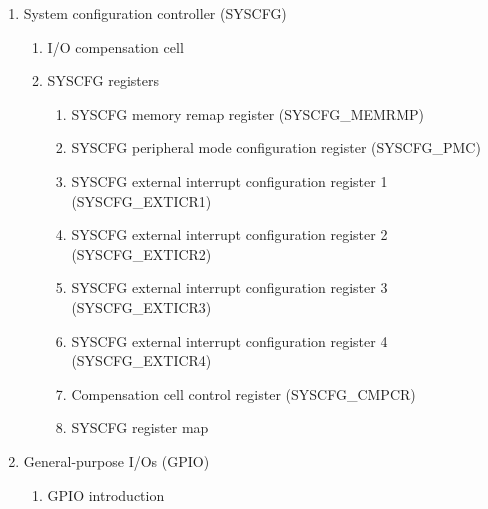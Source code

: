 \documentclass{article}
\begin{document}
\begin{enumerate}
\begin{enumerate}
\begin{enumerate}
            \item RCC Backup domain control register (RCC\_BDCR) 
            \item RCC clock control \& status register (RCC\_CSR) 
            \item RCC spread spectrum clock generation register (RCC\_SSCGR) 
            \item RCC PLLI2S configuration register (RCC\_PLLI2SCFGR) 
            \item RCC Dedicated Clocks Configuration Register (RCC\_DCKCFGR) 
            \item RCC register map 
        \end{enumerate}
    \end{enumerate}
    \item System configuration controller (SYSCFG) 
    \begin{enumerate}
        \item I/O compensation cell 
        \item SYSCFG registers 
        \begin{enumerate}
            \item SYSCFG memory remap register (SYSCFG\_MEMRMP) 
            \item SYSCFG peripheral mode configuration register (SYSCFG\_PMC) 
            \item SYSCFG external interrupt configuration register 1 (SYSCFG\_EXTICR1) 
            \item SYSCFG external interrupt configuration register 2 (SYSCFG\_EXTICR2) 
            \item SYSCFG external interrupt configuration register 3 (SYSCFG\_EXTICR3) 
            \item SYSCFG external interrupt configuration register 4 (SYSCFG\_EXTICR4) 
            \item Compensation cell control register (SYSCFG\_CMPCR) 
            \item SYSCFG register map 
        \end{enumerate}
    \end{enumerate}
    \item General-purpose I/Os (GPIO) 
    \begin{enumerate}
        \item GPIO introduction 

\end{enumerate}
\end{enumerate}
\end{document}

